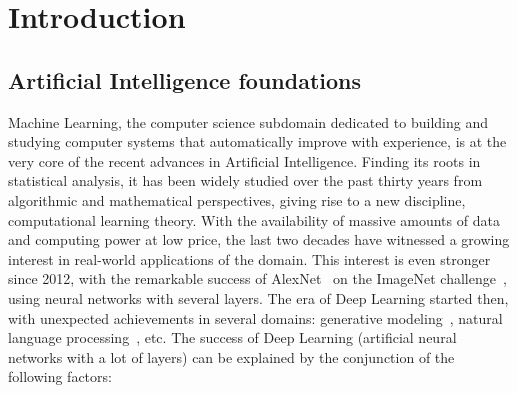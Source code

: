 \chapter{Introduction}
\minitoc
\section{Artificial Intelligence foundations}

Machine Learning, the computer science subdomain dedicated to building and studying computer systems that automatically improve with experience, is at the very core of the recent advances in Artificial Intelligence. Finding its roots in statistical analysis, it has been widely studied over the past thirty years from algorithmic and mathematical perspectives, giving rise to a new discipline, computational learning theory. With the availability of massive amounts of data and computing power at low price, the last two decades have witnessed a growing interest in  real-world applications of the domain. This interest is even stronger since 2012, with the remarkable success of AlexNet~\citep{krizhevsky2012imagenet} on the ImageNet challenge~\citep{imagenet_cvpr09}, using neural networks with several layers. The era of Deep Learning started then, with  unexpected achievements in several domains: generative modeling~\citep{goodfellow2014generative}, natural language processing~\citep{vaswani2017attention}, etc. The success of Deep Learning (artificial neural networks with a lot of layers) can be explained by the conjunction of the following factors: 

